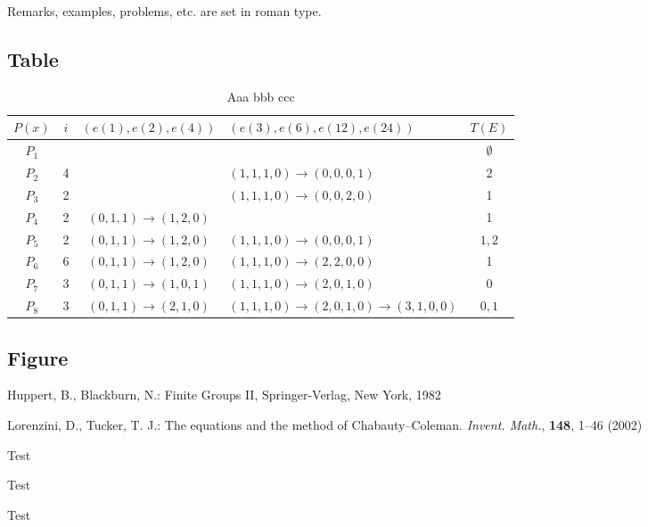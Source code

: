 \documentclass{amse-new}
\numberwithin{equation}{section} %
\begin{document}
\begin{remark}\label{re:1.2}
Remarks, examples, problems, etc. are set in roman type.
\end{remark}


\subsection{Table}

\begin{table}
\begin{tabular}{|c|c|c|l|c|}
\hline $P(x)$ & $i$& $(e(1),e(2),e(4))$ & $(e(3),e(6),e(12),e(24))$ & $T(E)$ \\
\hline $P_1$  &    & & &$\emptyset$ \\
\hline $P_2$  & 4  & & $(1,1,1,0)\rightarrow(0,0,0,1)$ &2\\
\hline $P_3$  & 2  & &$(1,1,1,0)\rightarrow(0,0,2,0)$ &1\\
\hline $P_4$  & 2  & $(0,1,1)\rightarrow(1,2,0)$ & &1\\
\hline $P_5$  & 2  & $(0,1,1)\rightarrow(1,2,0)$ &$(1,1,1,0)\rightarrow(0,0,0,1)$ &$1,2$\\
\hline $P_6$  & 6  & $(0,1,1)\rightarrow(1,2,0)$ &$(1,1,1,0)\rightarrow(2,2,0,0)$ &1\\
\hline $P_7$  & 3  & $(0,1,1)\rightarrow(1,0,1)$ &$(1,1,1,0)\rightarrow(2,0,1,0)$ &0\\
\hline $P_8$  & 3  & $(0,1,1)\rightarrow(2,1,0)$ &$(1,1,1,0)\rightarrow(2,0,1,0) \rightarrow(3,1,0,0)$ &$0,1$\\
\hline
\end{tabular}
\caption{Aaa bbb ccc\label{tab}}
\end{table}


\subsection{Figure}





\begin{thebibliography}{99}

Huppert, B., Blackburn, N.: Finite Groups II, Springer-Verlag, New
York, 1982

Lorenzini, D., Tucker, T. J.: The equations and the method of
Chabauty--Coleman. \emph{Invent. Math.}, \textbf{148}, 1--46
(2002)

Test

Test

Test

\end{thebibliography}
\end{document}
